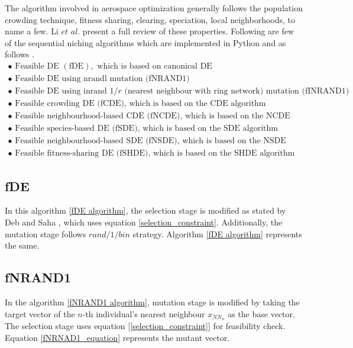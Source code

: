 The algorithm involved in aerospace optimization generally follows the population crowding technique\cite{De_jong,thomsen}, fitness sharing\cite{michigan,thomsen,goldberg}, clearing\cite{petrowski}, speciation\cite{balazs,Li}, local neighborhoods\cite{vrahatis,vrahatis_1}, to name a few. Li $et$ $al$. present a full review of these properties\cite{li_1}. Following are few of the sequential niching algorithms which are implemented in Python and as follows \cite{Poole3}.
$$
\begin{array}{l}
{\bullet \text { Feasible DE }(\mathrm{fDE}), \text { which is based on canonical DE }} \\ 
{\bullet \text { Feasible DE using nrandl mutation (fNRAND1)}}\\
{\bullet \text { Feasible DE using inrand } 1 / r \text { (nearest neighbour with ring network) mutation (fINRAND1)}} \\
{\bullet \text { Feasible crowding DE (fCDE), which is based on the CDE algorithm }} \\
{\bullet \text { Feasible neighbourhood-based CDE (fNCDE), which is based on the NCDE algorithm  }} \\ {\bullet \text { Feasible species-based DE (fSDE), which is based on the SDE algorithm }} \\
{\bullet \text { Feasible neighbourhood-based SDE (fNSDE), which is based on the NSDE algorithm }} \\ {\bullet \text { Feasible fitness-sharing DE (fSHDE), which is based on the SHDE algorithm }}
\end{array}
$$
\subsection{fDE}
In this algorithm \ref{fDE algorithm}, the selection stage is modified as stated by Deb and Saha \cite{Deb}, which uses equation \ref{selection_constraint}. Additionally, the mutation stage follows $rand/1/bin$ strategy. Algorithm \ref{fDE algorithm} represents the same.


\subsection{fNRAND1}
In the algorithm \ref{fNRAND1 algorithm}, mutation stage is modified by taking the target vector of the \(n\)-th individual's nearest neighbour $x_{{NN}_n}$ as the base vector. The selection stage uses equation [\ref{selection_constraint}] for feasibility check. Equation \ref{fNRNAD1_equation} represents the mutant vector. 



